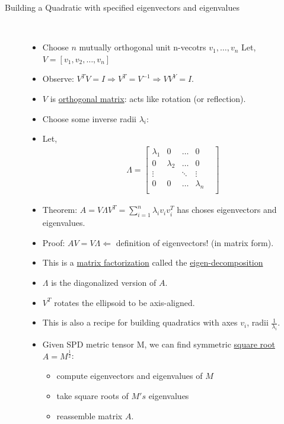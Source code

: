 \documentclass[10pt]{article}
\begin{document}
\begin{description}
	\item[Building a Quadratic with specified eigenvectors and eigenvalues]
		\
		\begin{itemize}
			\item Choose $n$ mutually orthogonal unit n-vecotrs $v_{1}, \dots, v_{n}$ Let, $V = [v_{1}, v_{2}, \dots, v_{n}]$
			\item Observe: $V^{T}V = I \Rightarrow V^{T} = V^{-1} \Rightarrow VV^{Y} = I$.
			\item $V$ is \underline{orthogonal matrix}: acts like rotation (or reflection).
			\item Choose some inverse radii $\lambda_{i}$:
			\item Let,
				\begin{align*}
					\Lambda =
						\begin{bmatrix}
							\lambda_{1} & 0 & \dots & 0\\
							0 & \lambda_{2} & \dots & 0\\
							\vdots & & \ddots & \vdots &\\
							0 & 0 & \dots & \lambda_{n}\\
						\end{bmatrix}
				\end{align*}
			\item Theorem: $A = V\Lambda V^{T} = \sum_{i=1}^{n} \lambda_{i} v_{i}v_{i}^T$ has choses eigenvectors and eigenvalues.
			\item Proof: $AV = V\Lambda \Leftarrow$ definition of eigenvectors! (in matrix form).
			\item This is a \underline{matrix factorization} called the \underline{eigen-decomposition}
			\item $\Lambda$ is the diagonalized version of $A$.
			\item $V^{T}$ rotates the ellipsoid to be axis-aligned.
			\item This is also a recipe for building quadratics with axes $v_{i}$, radii $\frac{1}{\lambda_{i}}$.
			\item Given SPD metric tensor M, we can find symmetric \underline{square root} $A = M^{\frac{1}{2}}$:
				\begin{itemize}
					\item compute eigenvectors and eigenvalues of $M$
					\item take square roots of $M's$ eigenvalues
					\item reassemble matrix $A$.
				\end{itemize}
		\end{itemize}
\end{description}
\newpage
\end{document}
